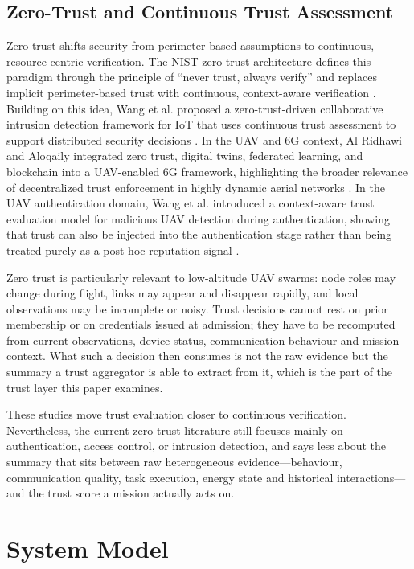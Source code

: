 \documentclass[notspecified,article,submit,moreauthors]{Definitions/mdpi}
\begin{document}
\subsection{Zero-Trust and Continuous Trust Assessment}
Zero trust shifts security from perimeter-based assumptions to continuous, resource-centric verification. The NIST zero-trust architecture defines this paradigm through the principle of ``never trust, always verify'' and replaces implicit perimeter-based trust with continuous, context-aware verification \cite{rose2020zero}. Building on this idea, Wang et al. proposed a zero-trust-driven collaborative intrusion detection framework for IoT that uses continuous trust assessment to support distributed security decisions \cite{wang2025continuous}. In the UAV and 6G context, Al Ridhawi and Aloqaily integrated zero trust, digital twins, federated learning, and blockchain into a UAV-enabled 6G framework, highlighting the broader relevance of decentralized trust enforcement in highly dynamic aerial networks \cite{ridhawi2023zerotrust6g}. In the UAV authentication domain, Wang et al. introduced a context-aware trust evaluation model for malicious UAV detection during authentication, showing that trust can also be injected into the authentication stage rather than being treated purely as a post hoc reputation signal \cite{wang2026wolf}.

Zero trust is particularly relevant to low-altitude UAV swarms: node roles may change during flight, links may appear and disappear rapidly, and local observations may be incomplete or noisy. Trust decisions cannot rest on prior membership or on credentials issued at admission; they have to be recomputed from current observations, device status, communication behaviour and mission context. What such a decision then consumes is not the raw evidence but the summary a trust aggregator is able to extract from it, which is the part of the trust layer this paper examines.

These studies move trust evaluation closer to continuous verification. Nevertheless, the current zero-trust literature still focuses mainly on authentication, access control, or intrusion detection, and says less about the summary that sits between raw heterogeneous evidence---behaviour, communication quality, task execution, energy state and historical interactions---and the trust score a mission actually acts on.

\section{System Model}
\label{sec:system_model}
\end{document}

